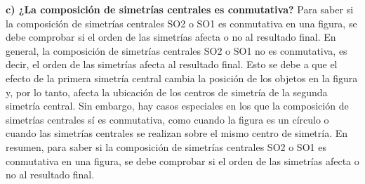 \documentclass{article}
\begin{document}
{\bf c) ¿La composición de simetrías centrales es conmutativa?}
Para saber si la composición de simetrías centrales SO2 o SO1 es conmutativa en una figura, se debe comprobar si el orden de las simetrías afecta o no al resultado final.  En general, la composición de simetrías centrales SO2 o SO1 no es conmutativa, es decir, el orden de las simetrías afecta al resultado final. Esto se debe a que el efecto de la primera simetría central cambia la posición de los objetos en la figura y, por lo tanto, afecta la ubicación de los centros de simetría de la segunda simetría central.  Sin embargo, hay casos especiales en los que la composición de simetrías centrales sí es conmutativa, como cuando la figura es un círculo o cuando las simetrías centrales se realizan sobre el mismo centro de simetría.  En resumen, para saber si la composición de simetrías centrales SO2 o SO1 es conmutativa en una figura, se debe comprobar si el orden de las simetrías afecta o no al resultado final.
\end{document}
